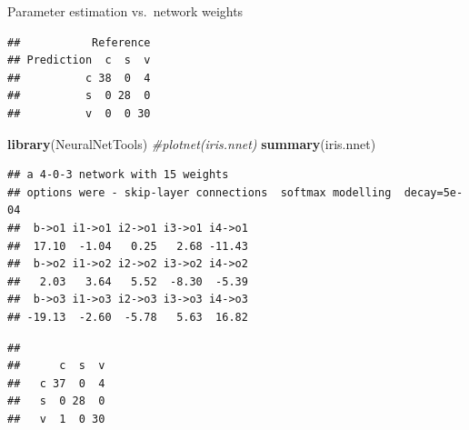 \documentclass[10pt,ignorenonframetext,]{beamer}
\newenvironment{Shaded}{\begin{snugshade}}{\end{snugshade}}
\newcommand{\KeywordTok}[1]{\textcolor[rgb]{0.13,0.29,0.53}{\textbf{#1}}}
\newcommand{\DataTypeTok}[1]{\textcolor[rgb]{0.13,0.29,0.53}{#1}}
\newcommand{\StringTok}[1]{\textcolor[rgb]{0.31,0.60,0.02}{#1}}
\newcommand{\CommentTok}[1]{\textcolor[rgb]{0.56,0.35,0.01}{\textit{#1}}}
\newcommand{\OperatorTok}[1]{\textcolor[rgb]{0.81,0.36,0.00}{\textbf{#1}}}
\newcommand{\NormalTok}[1]{#1}
\begin{document}
\begin{frame}[fragile]
\begin{block}{Parameter estimation vs.~network weights}
\begin{verbatim}
##           Reference
## Prediction  c  s  v
##          c 38  0  4
##          s  0 28  0
##          v  0  0 30
\end{verbatim}

\begin{Shaded}
\begin{Highlighting}[]
\KeywordTok{library}\NormalTok{(NeuralNetTools)}
\CommentTok{#plotnet(iris.nnet)}
\KeywordTok{summary}\NormalTok{(iris.nnet)}
\end{Highlighting}
\end{Shaded}

\begin{verbatim}
## a 4-0-3 network with 15 weights
## options were - skip-layer connections  softmax modelling  decay=5e-04
##  b->o1 i1->o1 i2->o1 i3->o1 i4->o1 
##  17.10  -1.04   0.25   2.68 -11.43 
##  b->o2 i1->o2 i2->o2 i3->o2 i4->o2 
##   2.03   3.64   5.52  -8.30  -5.39 
##  b->o3 i1->o3 i2->o3 i3->o3 i4->o3 
## -19.13  -2.60  -5.78   5.63  16.82
\end{verbatim}

\begin{Shaded}
\end{Shaded}

\begin{verbatim}
##    
##      c  s  v
##   c 37  0  4
##   s  0 28  0
##   v  1  0 30
\end{verbatim}

\end{block}

\end{frame}
\end{document}
